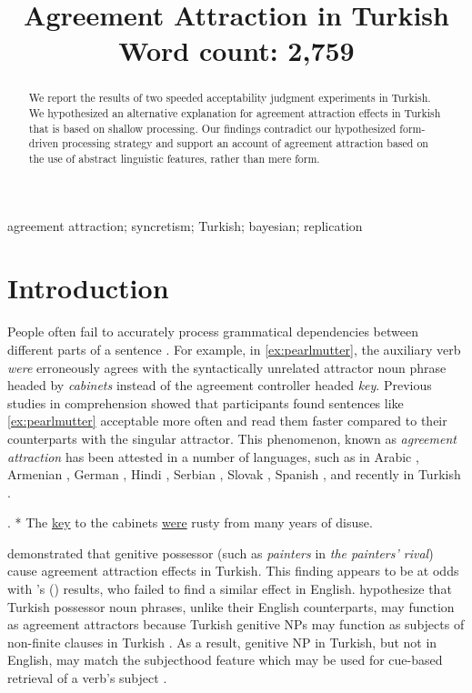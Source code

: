 \documentclass[brill,linguex]{glossa}\usepackage[]{graphicx}\usepackage[]{color}
\title[Agreement Attraction in Turkish]{Agreement Attraction in Turkish\\ \bigskip \large Word count: 2,759}
\author[A.B. \& C.D.]%
{%
  \spauthor{\texttt{Hidden Hidden (A.B.)}\\ 
  \institute{\texttt{Hidden University}}\\
  \small{
    \texttt{hidden@hidden.edu}}
  }
  \AND
  \spauthor{\texttt{Hidden Hidden (C.D.)}\\ 
  \institute{\texttt{Hidden University}}\\
  \small{
    \texttt{hidden@hidden.edu}}
  }%
}
\begin{document}
\sffamily
\maketitle


\begin{abstract}
We report the results of two speeded acceptability judgment experiments in Turkish. We hypothesized an alternative explanation for agreement attraction effects in Turkish that is based on shallow processing. Our findings contradict our hypothesized form-driven processing strategy and support an account of agreement attraction based on the use of abstract linguistic features, rather than mere form.
\end{abstract}

\begin{keywords}
  agreement attraction; syncretism; Turkish; bayesian; replication
\end{keywords}

\rmfamily


\section{Introduction}

People often fail to accurately process grammatical dependencies between different parts of a sentence \citep[e.g.,][]{GibsonThomas:1999,PhillipsEtAl:2011}. For example, in \ref{ex:pearlmutter}, the auxiliary verb \textit{were} erroneously agrees with the syntactically unrelated attractor noun phrase headed by \textit{cabinets} instead of the agreement controller headed \textit{key}. Previous  studies in comprehension \citep{NicolEtAl:1997, PearlmutterGarnseyBock:1999} showed that participants found sentences like \ref{ex:pearlmutter} acceptable more often and read them faster compared to their counterparts with the singular attractor. This phenomenon, known as \textit{agreement attraction} \citep{BockMiller:1991} has been attested in a number of languages, such as in Arabic \citep{TuckerEtAl:2015}, Armenian \citep{AvetisyanEtAl:2020}, German \citep{LagoFelser:2018}, Hindi \citep{BhatiaDillon:2020}, Serbian \citep{RisticEtAl:2016}, Slovak \citep{BadeckerKuminiak:2007}, Spanish \citep{LagoEtAl:2015}, and recently in Turkish \citep{LagoEtAl:2019}.


\ex. \label{ex:pearlmutter} * The \underline{key} to the cabinets \underline{were} rusty from many years of disuse. 


\citet{LagoEtAl:2019} demonstrated that genitive possessor (such as \textit{painters} in \textit{the painters' rival}) cause agreement attraction effects in Turkish. This finding appears to be at odds with \citeauthor{NicolEtAl:2016}'s (\citeyear{NicolEtAl:2016}) results, who failed to find a similar effect in English. \citet{LagoEtAl:2019} hypothesize that Turkish possessor noun phrases, unlike their English counterparts, may function as agreement attractors because Turkish genitive NPs may function as subjects of non-finite clauses in Turkish \citep{GokselKerslake:2005,Kornfilt:2011}. As a result, genitive NP in Turkish, but not in English, may match the subjecthood feature which may be used for cue-based retrieval of a verb's subject \citep{LewisVasishth:2005, ArnettWagers:2017}.
\end{document}
